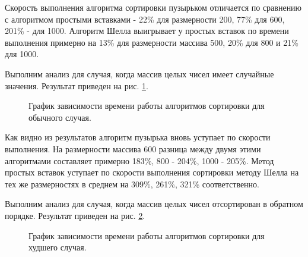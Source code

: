 Скорость выполнения алгоритма сортировки пузырьком отличается по сравнению с алгоритмом простыми вставками - 22\% для размерности 200, 77\% для 600, 201\% - для 1000. Алгоритм Шелла выигрывает у простых вставок по времени выполнения примерно на 13\% для размерности массива 500, 20\% для 800 и 21\% для 1000.

Выполним анализ для случая, когда массив целых чисел имеет случайные значения. Результат приведен на рис. \ref{fg:ref2}.
\begin{figure}[H]
	\centering
	\caption{График зависимости времени работы алгоритмов сортировки для обычного случая.} 
	\label{fg:ref2}
\end{figure}
Как видно из результатов алгоритм пузырька вновь уступает по скорости выполнения. На размерности массива 600 разница между двумя этими алгоритмами составляет примерно 183\%, 800 - 204\%, 1000 - 205\%. Метод простых вставок уступает по скорости выполнения сортировки методу Шелла на тех же размерностях в среднем на 309\%, 261\%, 321\% соответственно. 

Выполним анализ для случая, когда массив целых чисел отсортирован в обратном порядке. Результат приведен на рис. \ref{fg:ref3}.
\begin{figure}[H]
	\centering
	\caption{График зависимости времени работы алгоритмов сортировки для худшего случая.} 
	\label{fg:ref3}
\end{figure}

